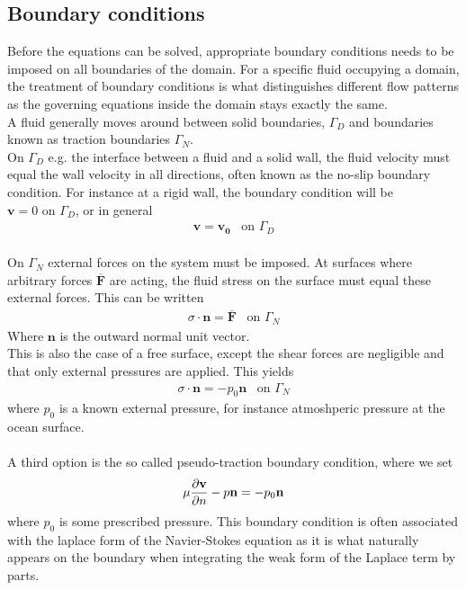 \subsection{Boundary conditions}
Before the equations can be solved, appropriate boundary conditions needs to be imposed on all boundaries of the domain. For a specific fluid occupying a domain, the treatment of boundary conditions is what distinguishes different flow patterns as the governing equations inside the domain stays exactly the same. 
\\
A fluid generally moves around between solid boundaries, $\Gamma_D$ and boundaries known as traction boundaries $\Gamma_N$.
\\
On $\Gamma_D$ e.g. the interface between a fluid and a solid wall, the fluid velocity must equal the wall velocity in all directions, often known as the no-slip boundary condition. For instance at a rigid wall, the boundary condition will be $\mathbf{v} = 0 \text{ on } \Gamma_D$, or in general 
\begin{align}
\mathbf{v} = \mathbf{v_0} \,\,\, \text{ on } \Gamma_D
\end{align}
\\
On $\Gamma_N$ external forces on the system must be imposed. At surfaces where arbitrary forces $\mathbf{\overline{F}}$ are acting, the fluid stress on the surface must equal these external forces. This can be written
\begin{align}
\sigma \cdot \mathbf{n} = \mathbf{\overline{F}}\,\,\, \text{ on } \Gamma_N
\end{align}
Where $\mathbf{n}$ is the outward normal unit vector. 
\\
This is also the case of a free surface, except the shear forces are negligible and that only external pressures are applied. This yields
\begin{align}
\sigma \cdot \mathbf{n} = -p_0 \mathbf{n} \,\,\, \text{ on } \Gamma_N
\end{align}
where $p_0$ is a known external pressure, for instance atmoshperic pressure at the ocean surface. 
\\
\\
A third option is the so called pseudo-traction boundary condition, where we set
\begin{align}
\mu \frac{\partial \mathbf{v}}{\partial n} - p\mathbf{n} = -p_0\mathbf{n}
\end{align}
where $p_0$ is some prescribed pressure. This boundary condition is often associated with the laplace form of the Navier-Stokes equation as it is what naturally appears on the boundary when integrating the weak form of the Laplace term by 	 parts. 

